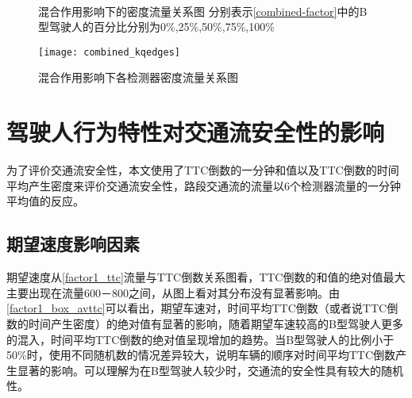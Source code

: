\begin{figure}[H]%
\centering
{}%
\\%
%
\caption[A set of four sub-floats.]{混合作用影响下的密度流量关系图
分别表示\autoref{combined-factor}中的B型驾驶人的百分比分别为0\%,25\%,50\%,75\%,100\%}%
\label{combined_kq}%
\end{figure}

\begin{figure}[H]
\begin{center}
\texttt{[image: combined\_kqedges]}
\caption{混合作用影响下各检测器密度流量关系图}
\label{combined_kqedges}
\end{center}
\end{figure}

\section{驾驶人行为特性对交通流安全性的影响}

为了评价交通流安全性，本文使用了TTC倒数的一分钟和值以及TTC倒数的时间平均产生密度来评价交通流安全性，路段交通流的流量以6个检测器流量的一分钟平均值的反应。


\subsection{期望速度影响因素}

期望速度从\autoref{factor1_ttc}流量与TTC倒数关系图看，TTC倒数的和值的绝对值最大主要出现在流量600－800之间，从图上看对其分布没有显著影响。由\autoref{factor1_box_avttc}可以看出，期望车速对，时间平均TTC倒数（或者说TTC倒数的时间产生密度）的绝对值有显著的影响，随着期望车速较高的B型驾驶人更多的混入，时间平均TTC倒数的绝对值呈现增加的趋势。当B型驾驶人的比例小于50\%时，使用不同随机数的情况差异较大，说明车辆的顺序对时间平均TTC倒数产生显著的影响。可以理解为在B型驾驶人较少时，交通流的安全性具有较大的随机性。

